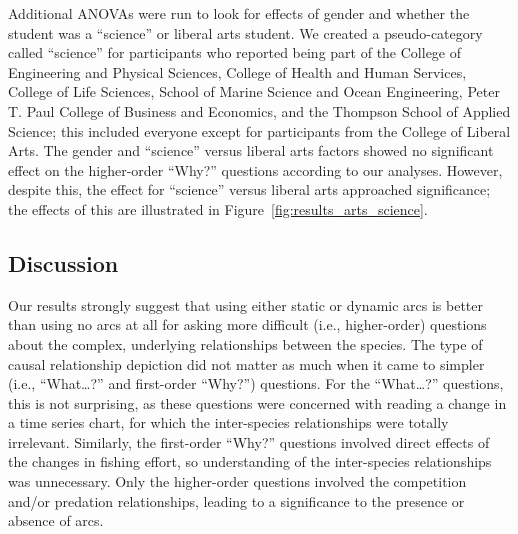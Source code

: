 Additional ANOVAs were run to look for effects of gender and whether the student was a ``science'' or liberal arts student.  We created a pseudo-category called ``science'' for participants who reported being part of the College of Engineering and Physical Sciences, College of Health and Human Services, College of Life Sciences, School of Marine Science and Ocean Engineering, Peter T. Paul College of Business and Economics, and the Thompson School of Applied Science; this included everyone except for participants from the College of Liberal Arts.  The gender and ``science'' versus liberal arts factors showed no significant effect on the higher-order ``Why?'' questions according to our analyses.  However, despite this, the effect for ``science'' versus liberal arts approached significance; the effects of this are illustrated in Figure~\ref{fig:results_arts_science}.  %

\subsection{Discussion}

Our results strongly suggest that using either static or dynamic arcs is better than using no arcs at all for asking more difficult (i.e., higher-order) questions about the complex, underlying relationships between the species.  The type of causal relationship depiction did not matter as much when it came to simpler (i.e., ``What\ldots?'' and first-order ``Why?'') questions.  For the ``What\ldots?'' questions, this is not surprising, as these questions were concerned with reading a change in a time series chart, for which the inter-species relationships were totally irrelevant.  Similarly, the first-order ``Why?'' questions involved direct effects of the changes in fishing effort, so understanding of the inter-species relationships was unnecessary.  Only the higher-order questions involved the competition and/or predation relationships, leading to a significance to the presence or absence of arcs.

